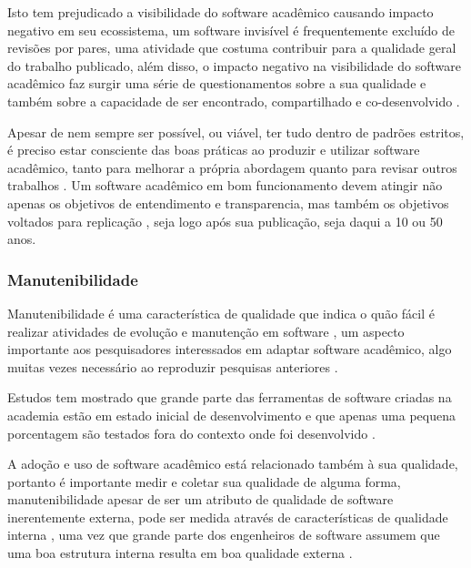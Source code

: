 Isto tem prejudicado a visibilidade do software acadêmico causando impacto
negativo em seu ecossistema, um software invisível é frequentemente excluído de
revisões por pares, uma atividade que costuma contribuir para a qualidade geral
do trabalho publicado, além disso, o
impacto negativo na visibilidade do software acadêmico faz surgir uma
série de questionamentos sobre a sua qualidade e também sobre a
capacidade de ser encontrado, compartilhado e co-desenvolvido
\cite{howison2013incentives, katz2014transitive} \cite{howison2016software}.

Apesar de nem sempre ser possível, ou viável, ter tudo dentro de padrões
estritos, é preciso estar consciente das boas práticas ao produzir e utilizar
software acadêmico, tanto para melhorar a própria abordagem quanto para
revisar outros trabalhos \cite{wilson2014best}. Um software acadêmico em bom
funcionamento devem atingir não apenas os objetivos de entendimento e
transparencia, mas também os objetivos voltados para replicação
\cite{stodden2010reproducible}, seja logo após sua publicação, seja daqui a 10 ou 50 anos.

\subsubsection{Manutenibilidade}


Manutenibilidade é uma característica de qualidade que indica o quão fácil é
realizar atividades de evolução e manutenção em software
\cite{kumar2012survey}, um aspecto importante aos pesquisadores interessados em
adaptar software acadêmico, algo muitas vezes necessário ao reproduzir
pesquisas anteriores \cite{peng2011reproducible}.

Estudos tem mostrado que grande parte das ferramentas de software criadas na
academia estão em estado inicial de desenvolvimento \cite{marshall2013tools} e
que apenas uma pequena porcentagem são testados fora do contexto onde foi
desenvolvido \cite{portillo2012tools}.


A adoção e uso de software acadêmico está relacionado também à sua qualidade,
portanto é importante medir e coletar sua qualidade de alguma forma,
manutenibilidade apesar de ser um atributo de qualidade de software
inerentemente externa, pode ser medida através de
características de qualidade interna \cite{hashim1996software,
dagpinar2003predicting}, uma vez que grande parte dos engenheiros de software
assumem que uma boa estrutura interna resulta em boa qualidade externa
\cite{fenton2014software}.

